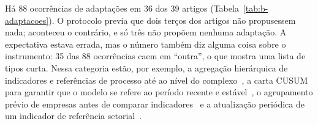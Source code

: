Há 88 ocorrências de adaptações em 36 dos 39 artigos
(Tabela~\ref{tab:b-adaptacoes}). O protocolo previa que dois terços dos
artigos não propusessem nada; aconteceu o contrário, e só três não propõem
nenhuma adaptação. A expectativa estava errada, mas o número também diz
alguma coisa sobre o instrumento: 35 das 88 ocorrências caem em ``outra'',
o que mostra uma lista de tipos curta. Nessa categoria estão, por exemplo,
a agregação hierárquica de indicadores e referências de processo até ao
nível do complexo~\cite{Beisheim2020}, a carta CUSUM para garantir que o
modelo se refere ao período recente e estável~\cite{Giacone2012}, o
agrupamento prévio de empresas antes de comparar indicadores~\cite{Bonfa2017}
e a atualização periódica de um indicador de referência
setorial~\cite{Boyd2013,Boyd2017}.

